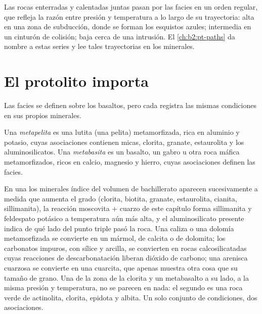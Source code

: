 Las rocas enterradas y calentadas juntas pasan por las facies en un orden regular, que
refleja la razón entre presión y temperatura a lo largo de su trayectoria: alta en una zona de
subducción, donde se forman los esquistos azules; intermedia en un cinturón de colisión; baja cerca de una intrusión.
El \cref{ch:b2:pt-paths} da nombre a estas series y lee tales trayectorias en los minerales.

\section{El protolito importa}\label{sec:b2:metamorphic-facies:protoliths}

Las facies se definen sobre los basaltos, pero cada  registra las mismas condiciones en
sus propios minerales.

\begin{definition}\label{def:b2:metamorphic-facies:protoliths}
Una \emph{metapelita} es una lutita (una pelita) metamorfizada, rica en
aluminio y potasio, cuyas asociaciones contienen micas, clorita, granate, estaurolita y
los aluminosilicatos. Una \emph{metabasita} es un basalto, un
gabro u otra roca máfica metamorfizados, ricos en calcio, magnesio y hierro, cuyas asociaciones definen
las facies.
\end{definition}

En una  los minerales índice del volumen de bachillerato aparecen sucesivamente a medida que
aumenta el grado (clorita, biotita, granate, estaurolita, cianita, sillimanita), la
reacción moscovita + cuarzo de este capítulo forma sillimanita y feldespato potásico a temperatura
aún más alta, y el aluminosilicato presente indica de qué lado del punto
triple pasó la roca. Una caliza o una dolomía metamorfizada se convierte en un mármol, de calcita o de
dolomita; los carbonatos impuros, con sílice y arcilla, se convierten en rocas calcosilicatadas cuyas
reacciones de descarbonatación liberan dióxido de carbono; una arenisca cuarzosa se convierte en una cuarcita,
que apenas muestra otra cosa que su tamaño de grano. Una  de la zona de la clorita y un
metabasalto a su lado, a la misma presión y temperatura, no se parecen en nada: el
segundo es una roca verde de actinolita, clorita, epidota y albita. Un solo conjunto de condiciones,
dos asociaciones.

